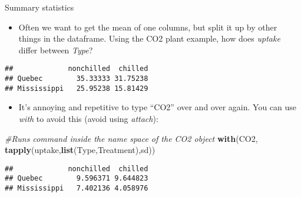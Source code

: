 \documentclass[
  ignorenonframetext,
  aspectratio=169]{beamer}
\newenvironment{Shaded}{\begin{snugshade}}{\end{snugshade}}
\newcommand{\CommentTok}[1]{\textcolor[rgb]{0.56,0.35,0.01}{\textit{#1}}}
\newcommand{\FunctionTok}[1]{\textcolor[rgb]{0.13,0.29,0.53}{\textbf{#1}}}
\newcommand{\NormalTok}[1]{#1}
\newcommand{\SpecialCharTok}[1]{\textcolor[rgb]{0.81,0.36,0.00}{\textbf{#1}}}
\providecommand{\tightlist}{%
  \setlength{\itemsep}{0pt}\setlength{\parskip}{0pt}}
\begin{document}
\begin{frame}[fragile]{Summary statistics}
\protect\hypertarget{summary-statistics}{}
\begin{itemize}[<+->]
\tightlist
\item
  Often we want to get the mean of one columns, but split it up by other
  things in the dataframe. Using the CO2 plant example, how does
  \emph{uptake} differ between \emph{Type}?
\end{itemize}

\footnotesize

\begin{Shaded}
\end{Shaded}

\begin{verbatim}
##             nonchilled  chilled
## Quebec        35.33333 31.75238
## Mississippi   25.95238 15.81429
\end{verbatim}

\normalsize

\begin{itemize}[<+->]
\tightlist
\item
  It's annoying and repetitive to type ``CO2'' over and over again. You
  can use \emph{with} to avoid this (avoid using \emph{attach}):
\end{itemize}

\footnotesize

\begin{Shaded}
\begin{Highlighting}[]
\CommentTok{\#Runs command inside the name space of the CO2 object}
\FunctionTok{with}\NormalTok{(CO2, }\FunctionTok{tapply}\NormalTok{(uptake,}\FunctionTok{list}\NormalTok{(Type,Treatment),sd))}
\end{Highlighting}
\end{Shaded}

\begin{verbatim}
##             nonchilled  chilled
## Quebec        9.596371 9.644823
## Mississippi   7.402136 4.058976
\end{verbatim}

\normalsize
\end{frame}
\end{document}
